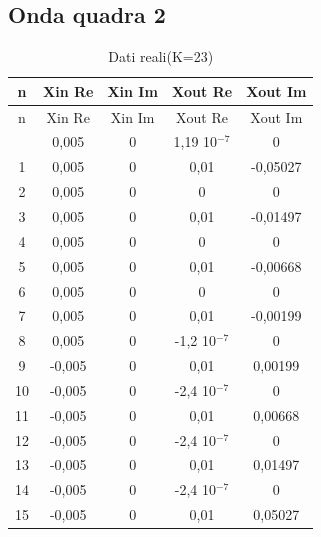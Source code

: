 \documentclass[a4paper, titlepage]{article}
\begin{document}
\subsection{Onda quadra 2}\label{tab:quadra2}
\begin{longtable}{*5c}
\caption{Dati reali(K=23)}
\label{}\\
\toprule
n & Xin Re & Xin Im & Xout Re & Xout Im \\
\midrule
\endfirsthead
n & Xin Re & Xin Im & Xout Re & Xout Im \\
\midrule
\endhead
\midrule
\endfoot
\bottomrule
\endlastfoot
0 & 0,005 & 0 & 1,19 10$^{-7}$ & 0\\
1 & 0,005   & 0 & 0,01 & -0,05027\\
2 & 0,005    & 0 & 0 & 0\\
3 & 0,005   & 0 & 0,01 & -0,01497 \\
4 & 0,005    & 0 & 0 & 0\\
5 & 0,005    & 0 & 0,01 & -0,00668\\
6 & 0,005    & 0 & 0 & 0\\
7 & 0,005    & 0 & 0,01 & -0,00199\\
8 & 0,005    & 0 & -1,2 10$^{-7}$ & 0\\
9 & -0,005    & 0 & 0,01 & 0,00199\\
10& -0,005    & 0 & -2,4 10$^{-7}$ & 0\\
11& -0,005    & 0 & 0,01 & 0,00668\\
12& -0,005    & 0 & -2,4 10$^{-7}$ & 0\\
13& -0,005    & 0 & 0,01 & 0,01497\\
14& -0,005    & 0 & -2,4 10$^{-7}$ & 0\\
15 & -0,005 & 0 & 0,01 & 0,05027 \\ 
\end{longtable}
\end{document}
